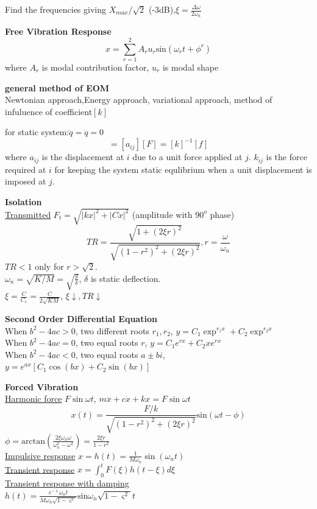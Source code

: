 \documentclass{article}
\begin{document}
\begin{multicols*}{3}
Find the frequencies giving $X_{max}/\sqrt{2}$ (-3dB),$\xi =\frac{\Delta \omega}{2\omega_n}$

\noindent\textbf{Free Vibration Response}\\
\begin{equation*}
  {x}=\sum_{r=1}^{2}A_{r}u_{r}\text{sin}(\omega_{r}t+\phi^{r})
\end{equation*}
where $A_{r}$ is modal contribution factor, $u_{r}$ is modal shape

\noindent\textbf{general method of EOM}\\
Newtonian approach,Energy approach, variational approach,
method of infuluence of coefficient$[k]$

for static system:$\ddot{q}=\dot{q}=0$
\begin{equation*}
  [q]=[a_{ij}][F]=[k]^{-1}[f]
\end{equation*}
where $a_{ij}$ is the displacement at $i$ due to a unit force applied at $j$.
$k_{ij}$ is the force required at $i$ for keeping the system static equlibrium when a unit displacement is imposed at $j$.

\noindent\textbf{Isolation}\\
\underline{Transmitted} $F_{t}=\sqrt{|kx|^{2}+|C\dot{x}|^{2}}$ (amplitude with $90^{o}$ phase)
\begin{equation*}
  TR=\frac{\sqrt{1+(2\xi r)^{2}}}{\sqrt{(1-r^{2})^{2}+(2\xi r)^{2}}}, r=\frac{\omega}{\omega_{n}}
\end{equation*}
$TR<1$ only for $r> \sqrt{2}$.\\
$\omega_{n}=\sqrt{K/M}=\sqrt{\frac{g}{\delta}}$, $\delta$ is static deflection. \\
$\xi= \frac{C}{C_{c}}=\frac{C}{2\sqrt{KM}}$, $\xi \downarrow, TR \downarrow$

\noindent\textbf{Second Order Differential Equation}\\
 When $b^2 - 4ac > 0$, two different roots $r_1, r_2$, $y = C_1\exp^{r_1 x} + C_2\exp^{r_2 x}$ \\
 When $b^2 - 4ac = 0$, two equal roots $r$, $y = C_1 e^{r x} + C_2 x e^{r x}$\\
 When $b^2 - 4ac < 0$, two equal roots $a \pm bi$, $y = e^{ax} [C_1 \cos(b x) + C_2 \sin(b x)]$

\noindent\textbf{Forced Vibration}\\
\underline{Harmonic force} $F\sin\omega t$, $m\ddot{x} + c\dot{x} + kx = F\sin\omega t$
\begin{equation*}
  x(t)=\frac{F/k}{\sqrt{(1-r^{2})^{2}+(2\xi r)^{2}}}\text{sin}(\omega t-\phi)
\end{equation*}
$\phi=\text{arctan}(\frac{2 \xi \omega_{n}\omega}{\omega_{n}^{2}-\omega^{2}})=\frac{2\xi r}{1-r^{2}}$\\
\underline{Impulsive response} $x=h(t) = \frac{1}{M\omega_n}\sin(\omega_n t)$\\
\underline{Transient response}  $x = \int_0^t F(\xi) h(t-\xi) d\xi$\\
\underline{Transient response with damping}\\
$h(t)=\frac{e^{-\varsigma}\omega_{n}t}{M\omega_{n}\sqrt{1-\varsigma^{2}}}\text{sin}\omega_{n}\sqrt{1-\varsigma^{2}}t$


\end{multicols*}
\end{document}
